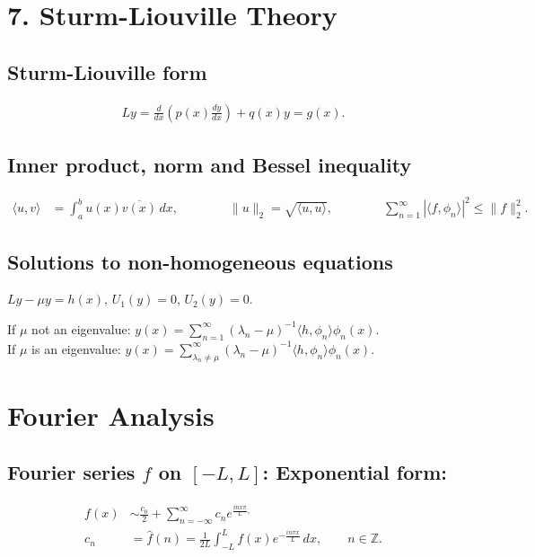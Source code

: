 \section*{7. Sturm-Liouville Theory}

\subsection*{Sturm-Liouville form}
\begin{align*}
 Ly = \frac{d}{dx} \left(p(x)\frac{dy}{dx}\right) + q(x)y = g(x).
\end{align*}

\subsection*{Inner product, norm and Bessel inequality}
\begin{align*}
 \langle u,v\rangle &= \int_a^b u(x)\overline {v(x)}\, dx, 
 \qquad \qquad  \|u\|_2 = \sqrt{\langle u,u\rangle },
 \qquad \qquad \sum_{n=1}^{\infty} |\langle f, \phi_n\rangle|^2 \leq 
 \|f\|_2^2.
\end{align*}

\subsection*{Solutions to non-homogeneous equations}
\begin{center}$Ly-\mu y = h(x)$, $U_1(y)=0$, $U_2(y)=0$. \end{center}
If $\mu$ not an eigenvalue: $y(x) = \sum_{n=1}^\infty (\lambda_n- \mu)^{-1}\langle h,\phi_n 
\rangle \phi_n(x)$.\\
If $\mu$ is an eigenvalue: $y(x) = \sum_{\lambda_n\neq \mu}^\infty (\lambda_n - \mu)^{-1}\langle h,\phi_n 
\rangle \phi_n(x)$.

\section*{Fourier Analysis}

 \subsection*{Fourier series $f$ on $[-L,L]$: Exponential form:}
 
 \begin{align*}
  f(x) &\sim \frac{c_0}2 + \sum_{n=-\infty}^\infty c_n e^{\frac{inx\pi}{L},}\\
  c_n &= \hat f(n) = \frac 1{2L} \int_{-L}^L f(x) e^{-\frac{in\pi x}L}\, dx, \qquad n\in \mathbb Z.
 \end{align*}


